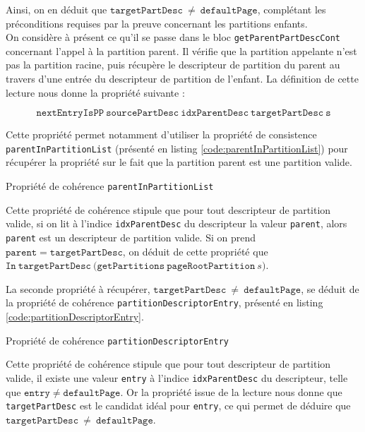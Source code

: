 			Ainsi, on en déduit que $\mathtt{targetPartDesc}~\neq~\mathtt{defaultPage}$, complétant les préconditions requises par la preuve concernant les partitions enfants.\\

			On considère à présent ce qu'il se passe dans le bloc \texttt{getParentPartDescCont} concernant l'appel à la partition parent. Il vérifie que la partition appelante n'est pas la partition racine, puis récupère le descripteur de partition du parent au travers d'une entrée du descripteur de partition de l'enfant. La définition de cette lecture nous donne la propriété suivante :

			$$\mathtt{nextEntryIsPP~sourcePartDesc~idxParentDesc~targetPartDesc~s}$$

			Cette propriété permet notamment d'utiliser la propriété de consistence \texttt{parentInPartitionList} (présenté en listing \ref{code:parentInPartitionList}) pour récupérer la propriété sur le fait que la partition parent est une partition valide. 

			\begin{listing}[!ht]
				\caption{Propriété de cohérence \texttt{parentInPartitionList}}
				\label{code:parentInPartitionList}
			\end{listing}

			Cette propriété de cohérence stipule que pour tout descripteur de partition valide, si on lit à l'indice \texttt{idxParentDesc} du descripteur la valeur \texttt{parent}, alors \texttt{parent} est un descripteur de partition valide. Si on prend $\mathtt{parent} = \mathtt{targetPartDesc}$, on déduit de cette propriété que $\mathtt{In~targetPartDesc~(getPartitions~pageRootPartition}~s\mathtt{)}$.

			La seconde propriété à récupérer, $\mathtt{targetPartDesc}~\neq~\mathtt{defaultPage}$, se déduit de la propriété de cohérence \texttt{partitionDescriptorEntry}, présenté en listing \ref{code:partitionDescriptorEntry}.
			\begin{listing}[!ht]
				\caption{Propriété de cohérence \texttt{partitionDescriptorEntry}}
				\label{code:partitionDescriptorEntry}
			\end{listing}

			Cette propriété de cohérence stipule que pour tout descripteur de partition valide, il existe une valeur \texttt{entry} à l'indice \texttt{idxParentDesc} du descripteur, telle que $\mathtt{entry} \neq \mathtt{defaultPage}$. Or la propriété issue de la lecture nous donne que \texttt{targetPartDesc} est le candidat idéal pour \texttt{entry}, ce qui permet de déduire que $\mathtt{targetPartDesc}~\neq~\mathtt{defaultPage}$.

